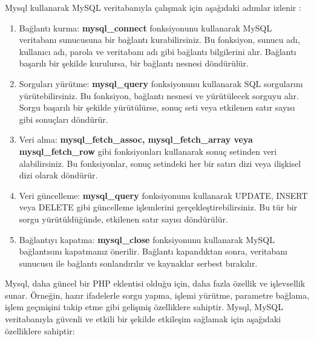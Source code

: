 Mysql  kullanarak MySQL veritabanıyla çalışmak için aşağıdaki adımlar izlenir :
\begin{enumerate}
\item Bağlantı kurma: \textbf{mysql\_connect}  fonksiyonunu kullanarak MySQL veritabanı sunucusuna bir bağlantı kurabilirsiniz. Bu fonksiyon, sunucu adı, kullanıcı adı, parola ve veritabanı adı gibi bağlantı bilgilerini alır. Bağlantı başarılı bir şekilde kurulursa, bir bağlantı nesnesi döndürülür.

\item Sorguları yürütme: \textbf{mysql\_query} fonksiyonunu kullanarak SQL sorgularını yürütebilirsiniz. Bu fonksiyon, bağlantı nesnesi ve yürütülecek sorguyu alır. Sorgu başarılı bir şekilde yürütülürse, sonuç seti veya etkilenen satır sayısı gibi sonuçları döndürür.

\item Veri alma: \textbf{mysql\_fetch\_assoc, mysql\_fetch\_array veya mysql\_fetch\_row} gibi fonksiyonları kullanarak sonuç setinden veri alabilirsiniz. Bu fonksiyonlar, sonuç setindeki her bir satırı dizi veya ilişkisel dizi olarak döndürür.

\item Veri güncelleme: \textbf{mysql\_query} fonksiyonunu kullanarak UPDATE, INSERT veya DELETE gibi güncelleme işlemlerini gerçekleştirebilirsiniz. Bu tür bir sorgu yürütüldüğünde, etkilenen satır sayısı döndürülür.

\item Bağlantıyı kapatma: \textbf{mysql\_close} fonksiyonunu kullanarak MySQL bağlantısını kapatmanız önerilir. Bağlantı kapandıktan sonra, veritabanı sunucusu ile bağlantı sonlandırılır ve kaynaklar serbest bırakılır.
\end{enumerate}
Mysql, daha güncel bir PHP eklentisi olduğu için, daha fazla özellik ve işlevsellik sunar. Örneğin, hazır ifadelerle sorgu yapma, işlemi yürütme, parametre bağlama, işlem geçmişini takip etme gibi gelişmiş özelliklere sahiptir.
Mysql, MySQL veritabanıyla güvenli ve etkili bir şekilde etkileşim sağlamak için aşağıdaki  özelliklere sahiptir:
